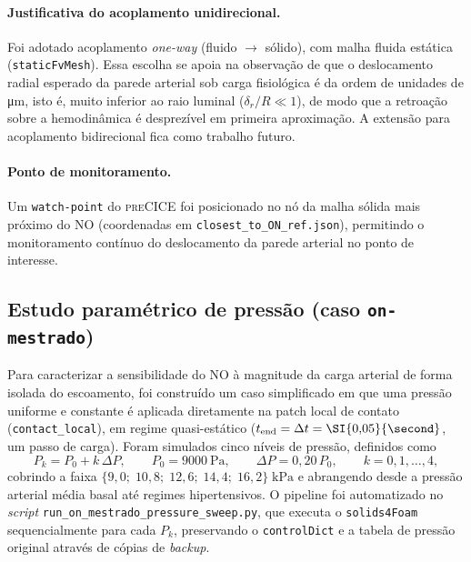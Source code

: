 \paragraph{Justificativa do acoplamento unidirecional.}
Foi adotado acoplamento \emph{one-way} (fluido \(\to\) sólido), com malha
fluida estática (\texttt{staticFvMesh}). Essa escolha se apoia na observação
de que o deslocamento radial esperado da parede arterial sob carga
fisiológica é da ordem de unidades de \si{\micro\meter}, isto é, muito
inferior ao raio luminal (\(\delta_r/R \ll 1\)), de modo que a retroação
sobre a hemodinâmica é desprezível em primeira aproximação. A extensão para
acoplamento bidirecional fica como trabalho futuro.

\paragraph{Ponto de monitoramento.}
Um \texttt{watch-point} do \textsc{preCICE} foi posicionado no nó da malha
sólida mais próximo do NO (coordenadas em \texttt{closest\_to\_ON\_ref.json}),
permitindo o monitoramento contínuo do deslocamento da parede arterial no
ponto de interesse.

\subsection{Estudo paramétrico de pressão (caso \texttt{on-mestrado})}
\label{sec:metodologia-sweep}

Para caracterizar a sensibilidade do NO à magnitude da carga arterial de
forma isolada do escoamento, foi construído um caso simplificado em que uma
pressão uniforme e constante é aplicada diretamente na patch local de contato
(\texttt{contact\_local}), em regime quasi-estático
(\(t_{\mathrm{end}} = \Delta t = \SI{0{,}05}{\second}\), um passo de carga).
Foram simulados cinco níveis de pressão, definidos como
\begin{equation}
  P_k = P_0 + k\, \Delta P,
  \qquad
  P_0 = \SI{9000}{\pascal},
  \qquad
  \Delta P = 0{,}20\,P_0,
  \qquad
  k = 0, 1, \dots, 4,
  \label{eq:sweep}
\end{equation}
cobrindo a faixa \(\{9{,}0;\; 10{,}8;\; 12{,}6;\; 14{,}4;\; 16{,}2\}\;\si{\kilo\pascal}\)
e abrangendo desde a pressão arterial média basal até regimes
hipertensivos. O pipeline foi automatizado no \emph{script}
\texttt{run\_on\_mestrado\_pressure\_sweep.py}, que executa o
\texttt{solids4Foam} sequencialmente para cada \(P_k\), preservando o
\texttt{controlDict} e a tabela de pressão original através de cópias de
\emph{backup}.

